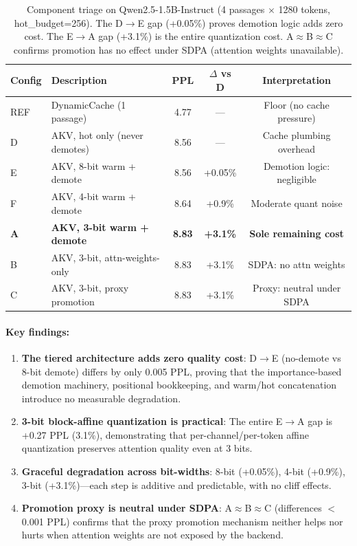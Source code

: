\documentclass[11pt,a4paper]{article}
\begin{document}
\begin{table}[h]
\centering
\begin{tabular}{llccc}
\toprule
\textbf{Config} & \textbf{Description} & \textbf{PPL} & \textbf{$\Delta$ vs D} & \textbf{Interpretation} \\
\midrule
REF & DynamicCache (1 passage) & 4.77 & --- & Floor (no cache pressure) \\
\midrule
D & AKV, hot only (never demotes) & 8.56 & --- & Cache plumbing overhead \\
E & AKV, 8-bit warm + demote & 8.56 & +0.05\% & Demotion logic: negligible \\
F & AKV, 4-bit warm + demote & 8.64 & +0.9\% & Moderate quant noise \\
\textbf{A} & \textbf{AKV, 3-bit warm + demote} & \textbf{8.83} & \textbf{+3.1\%} & \textbf{Sole remaining cost} \\
B & AKV, 3-bit, attn-weights-only & 8.83 & +3.1\% & SDPA: no attn weights \\
C & AKV, 3-bit, proxy promotion & 8.83 & +3.1\% & Proxy: neutral under SDPA \\
\bottomrule
\end{tabular}
\caption{Component triage on Qwen2.5-1.5B-Instruct (4 passages $\times$ 1280 tokens, hot\_budget=256). The D$\to$E gap (+0.05\%) proves demotion logic adds zero cost. The E$\to$A gap (+3.1\%) is the entire quantization cost. A$\approx$B$\approx$C confirms promotion has no effect under SDPA (attention weights unavailable).}
\label{tab:main_results}
\end{table}

\paragraph{Key findings:}
\begin{enumerate}
    \item \textbf{The tiered architecture adds zero quality cost}: D$\to$E (no-demote vs 8-bit demote) differs by only 0.005 PPL, proving that the importance-based demotion machinery, positional bookkeeping, and warm/hot concatenation introduce no measurable degradation.
    \item \textbf{3-bit block-affine quantization is practical}: The entire E$\to$A gap is +0.27 PPL (3.1\%), demonstrating that per-channel/per-token affine quantization preserves attention quality even at 3 bits.
    \item \textbf{Graceful degradation across bit-widths}: 8-bit (+0.05\%), 4-bit (+0.9\%), 3-bit (+3.1\%)---each step is additive and predictable, with no cliff effects.
    \item \textbf{Promotion proxy is neutral under SDPA}: A$\approx$B$\approx$C (differences $<$0.001 PPL) confirms that the proxy promotion mechanism neither helps nor hurts when attention weights are not exposed by the backend.
\end{enumerate}
\end{document}
